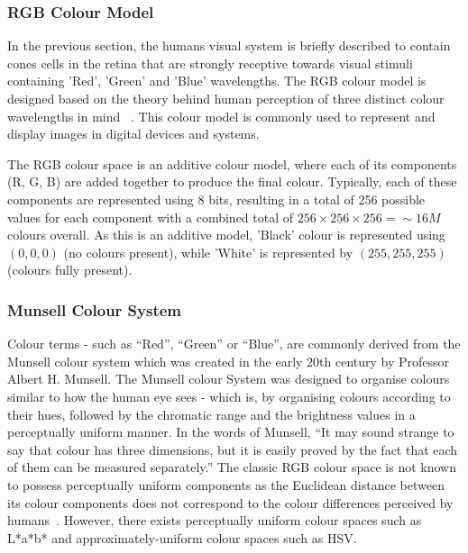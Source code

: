 \vspace{1em}
\subsubsection{RGB Colour Model}
In the previous section, the humans visual system is briefly described to contain 
cones cells in the retina that are strongly receptive towards visual stimuli containing 'Red', 'Green' and 'Blue' wavelengths.
The RGB colour model is designed based on the theory behind human perception
of three distinct colour wavelengths in mind ~\cite{young1802ii, travis1991effective}. This colour model is commonly used to represent and display images in digital devices and systems.

The RGB colour space is an additive colour model, where each of its
components (R, G, B) are added together to produce the final colour. Typically, each of these components are represented using 8 bits, resulting in a total of 256 possible values
for each component with a combined total of $256 \times 256 \times 256 = \sim 16M$ colours overall. As this is an additive model, 'Black' colour is
represented using $(0, 0, 0)$ (no colours present), while 'White' is represented by $(255, 255, 255)$ (colours fully present). 



\vspace{1em}
\subsubsection{Munsell Colour System}
\label{section:munsellcs}
Colour terms - such as ``Red'', ``Green'' or ``Blue'', are commonly derived from
the Munsell colour system which was created in the early 20th century by
Professor Albert H. Munsell. The Munsell colour System was designed to organise colours similar to how the human eye sees - which is, by
organising colours according to their hues, followed by the chromatic range
and the brightness values in a perceptually uniform manner. In the words of
Munsell, ``It may sound strange to say that colour has three dimensions, but it
is easily proved by the fact that each of them can be measured separately.''
The classic RGB colour space is not known to possess perceptually uniform components as the Euclidean distance between its colour components does not correspond to the colour differences perceived by humans~\cite{paschos2001perceptually}. However, there exists perceptually uniform colour spaces such as L*a*b* and approximately-uniform colour spaces such as HSV.

